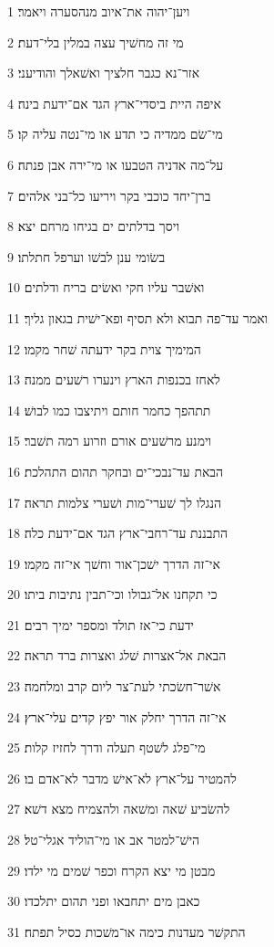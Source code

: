 \par 1 ויען־יהוה את־איוב מנהסערה ויאמר׃
\par 2 מי זה מחשׁיך עצה במלין בלי־דעת׃
\par 3 אזר־נא כגבר חלציך ואשׁאלך והודיעני׃
\par 4 איפה היית ביסדי־ארץ הגד אם־ידעת בינה׃
\par 5 מי־שׂם ממדיה כי תדע או מי־נטה עליה קו׃
\par 6 על־מה אדניה הטבעו או מי־ירה אבן פנתה׃
\par 7 ברן־יחד כוכבי בקר ויריעו כל־בני אלהים׃
\par 8 ויסך בדלתים ים בגיחו מרחם יצא׃
\par 9 בשׂומי ענן לבשׁו וערפל חתלתו׃
\par 10 ואשׁבר עליו חקי ואשׂים בריח ודלתים׃
\par 11 ואמר עד־פה תבוא ולא תסיף ופא־ישׁית בגאון גליך׃
\par 12 המימיך צוית בקר ידעתה שׁחר מקמו׃
\par 13 לאחז בכנפות הארץ וינערו רשׁעים ממנה׃
\par 14 תתהפך כחמר חותם ויתיצבו כמו לבושׁ׃
\par 15 וימנע מרשׁעים אורם וזרוע רמה תשׁבר׃
\par 16 הבאת עד־נבכי־ים ובחקר תהום התהלכת׃
\par 17 הנגלו לך שׁערי־מות ושׁערי צלמות תראה׃
\par 18 התבננת עד־רחבי־ארץ הגד אם־ידעת כלה׃
\par 19 אי־זה הדרך ישׁכן־אור וחשׁך אי־זה מקמו׃
\par 20 כי תקחנו אל־גבולו וכי־תבין נתיבות ביתו׃
\par 21 ידעת כי־אז תולד ומספר ימיך רבים׃
\par 22 הבאת אל־אצרות שׁלג ואצרות ברד תראה׃
\par 23 אשׁר־חשׂכתי לעת־צר ליום קרב ומלחמה׃
\par 24 אי־זה הדרך יחלק אור יפץ קדים עלי־ארץ׃
\par 25 מי־פלג לשׁטף תעלה ודרך לחזיז קלות׃
\par 26 להמטיר על־ארץ לא־אישׁ מדבר לא־אדם בו׃
\par 27 להשׂביע שׁאה ומשׁאה ולהצמיח מצא דשׁא׃
\par 28 הישׁ־למטר אב או מי־הוליד אגלי־טל׃
\par 29 מבטן מי יצא הקרח וכפר שׁמים מי ילדו׃
\par 30 כאבן מים יתחבאו ופני תהום יתלכדו׃
\par 31 התקשׁר מעדנות כימה או־משׁכות כסיל תפתח׃
